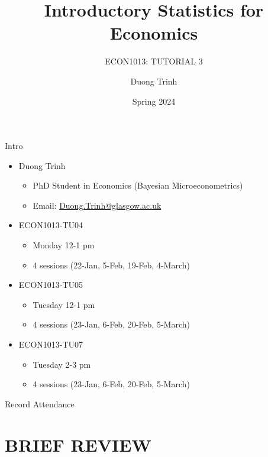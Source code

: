 \documentclass[
  11pt,
  ignorenonframetext,
]{beamer}
\title{Introductory Statistics for Economics}
\subtitle{ECON1013: TUTORIAL 3}
\author{Duong Trinh}
\date{Spring 2024}
\institute{University of Glasgow}
\providecommand{\tightlist}{%
  \setlength{\itemsep}{0pt}\setlength{\parskip}{0pt}}
\begin{document}
\frame{\titlepage}

\begin{frame}{Intro}
\protect\hypertarget{intro}{}
\begin{itemize}
\tightlist
\item
  Duong Trinh

  \begin{itemize}
  \tightlist
  \item
    PhD Student in Economics (Bayesian Microeconometrics)
  \item
    Email: \underline{Duong.Trinh@glasgow.ac.uk}
  \end{itemize}
\end{itemize}

\vspace{3mm}

\begin{itemize}
\tightlist
\item
  ECON1013-TU04

  \begin{itemize}
  \tightlist
  \item
    Monday 12-1 pm
  \item
    4 sessions (22-Jan, 5-Feb, 19-Feb, 4-March)
  \end{itemize}
\item
  ECON1013-TU05

  \begin{itemize}
  \tightlist
  \item
    Tuesday 12-1 pm
  \item
    4 sessions (23-Jan, 6-Feb, 20-Feb, 5-March)
  \end{itemize}
\item
  ECON1013-TU07

  \begin{itemize}
  \tightlist
  \item
    Tuesday 2-3 pm
  \item
    4 sessions (23-Jan, 6-Feb, 20-Feb, 5-March)
  \end{itemize}
\end{itemize}
\end{frame}

\begin{frame}{Record Attendance}
\protect\hypertarget{record-attendance}{}
\end{frame}

\hypertarget{brief-review}{%
\section{BRIEF REVIEW}\label{brief-review}}
\end{document}
